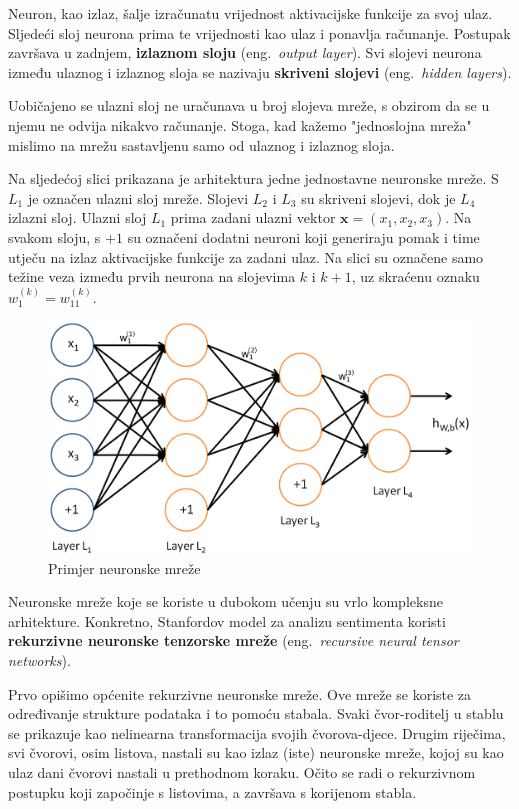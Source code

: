\documentclass[a4paper,twoside,12pt]{memoir} %
\newcommand{\ti}[1]{\textit{#1\/}}
\newcommand{\tb}{\textbf}
\begin{document}
	Neuron, kao izlaz, šalje izračunatu vrijednost aktivacijske funkcije za svoj ulaz. Sljedeći sloj neurona prima te vrijednosti kao ulaz i ponavlja računanje. Postupak završava u zadnjem, \tb{izlaznom sloju} (eng.~\ti{output layer}). Svi slojevi neurona između ulaznog i izlaznog sloja se nazivaju \tb{skriveni slojevi} (eng.~\ti{hidden layers}).

	Uobičajeno se ulazni sloj ne uračunava u broj slojeva mreže, s obzirom da se u njemu ne odvija nikakvo računanje. Stoga, kad kažemo "jednoslojna mreža" mislimo na mrežu sastavljenu samo od ulaznog i izlaznog sloja.

	\bigskip

	Na sljedećoj slici prikazana je arhitektura jedne jednostavne neuronske mreže. S $L_1$ je označen ulazni sloj mreže. Slojevi $L_2$ i $L_3$ su skriveni slojevi, dok je $L_4$ izlazni sloj. Ulazni sloj $L_1$ prima zadani ulazni vektor $\mathbf{x} = (x_1, x_2, x_3)$. Na svakom sloju, s $+1$ su označeni dodatni neuroni koji generiraju pomak i time utječu na izlaz aktivacijske funkcije za zadani ulaz. Na slici su označene samo težine veza između prvih neurona na slojevima $k$ i $k + 1$, uz skraćenu oznaku $w_1^{(k)} = w_{11}^{(k)}$.

	\begin{figure}[H]
		\centering
		\includegraphics[scale = 0.35]{network.png}
		\caption{Primjer neuronske mreže}
	\end{figure}

	Neuronske mreže koje se koriste u dubokom učenju su vrlo kompleksne arhitekture. Konkretno, Stanfordov model za analizu sentimenta koristi \tb{rekurzivne neuronske tenzorske mreže} (eng.~\ti{recursive neural tensor networks}).

	Prvo opišimo općenite rekurzivne neuronske mreže. Ove mreže se koriste za određivanje strukture podataka i to pomoću stabala. Svaki čvor-roditelj u stablu se prikazuje kao nelinearna transformacija svojih čvorova-djece. Drugim riječima, svi čvorovi, osim listova, nastali su kao izlaz (iste) neuronske mreže, kojoj su kao ulaz dani čvorovi nastali u prethodnom koraku. Očito se radi o rekurzivnom postupku koji započinje s listovima, a završava s korijenom stabla.
\end{document}
